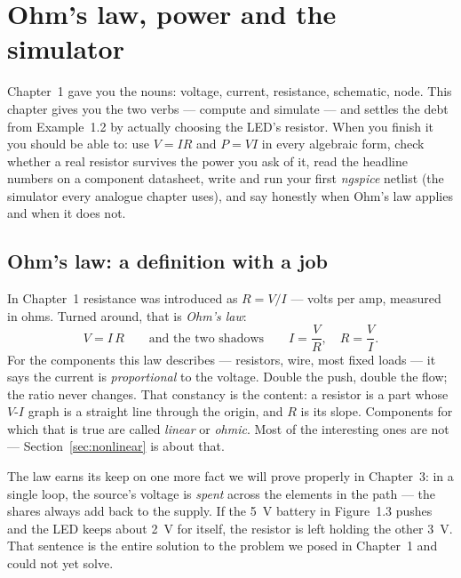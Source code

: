 \chapter{Ohm's law, power and the simulator}
\label{ch:ohm}

Chapter~1 gave you the nouns: voltage, current, resistance, schematic, node.
This chapter gives you the two verbs — compute and simulate — and settles the
debt from Example~1.2 by actually choosing the LED's resistor. When you finish
it you should be able to: use $V=IR$ and $P=VI$ in every algebraic form,
check whether a real resistor survives the power you ask of it, read the
headline numbers on a component datasheet, write and run your first
\emph{ngspice} netlist (the simulator every analogue chapter uses), and say
honestly when Ohm's law applies and when it does not.

\section{Ohm's law: a definition with a job}
\label{sec:ohmslaw}

In Chapter~1 resistance was introduced as $R=V/I$ — volts per amp, measured in
ohms. Turned around, that is \emph{Ohm's law}:
\[
  V = I\,R \qquad\text{and the two shadows}\qquad I = \frac{V}{R},
  \quad R = \frac{V}{I}.
\]
For the components this law describes — resistors, wire, most fixed loads —
it says the current is \emph{proportional} to the voltage. Double the push,
double the flow; the ratio never changes. That constancy is the content: a
resistor is a part whose $V$-$I$ graph is a straight line through the origin,
and $R$ is its slope. Components for which that is
true are called \emph{linear} or \emph{ohmic}. Most of
the interesting ones are not — Section~\ref{sec:nonlinear} is about that.

The law earns its keep on one more fact we will prove properly in
Chapter~3: in a single loop, the source's voltage is \emph{spent} across the
elements in the path — the shares always add back to the supply. If the
\qty{5}{\volt} battery in Figure~1.3 pushes and the LED keeps about
\qty{2}{\volt} for itself, the resistor is left holding the other
\qty{3}{\volt}. That sentence is the entire solution to the problem we posed
in Chapter~1 and could not yet solve.

